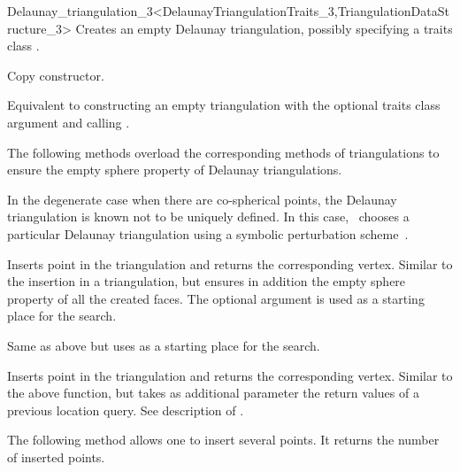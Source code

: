\begin{ccRefClass}{Delaunay_triangulation_3<DelaunayTriangulationTraits_3,TriangulationDataStructure_3>}
{Creates an empty Delaunay triangulation, possibly specifying a traits class
.}

{Copy constructor.}

{Equivalent to constructing an empty triangulation with the optional 
traits class argument and calling .}

\ccOperations


The following methods overload the corresponding methods of
triangulations to ensure the empty sphere property of Delaunay 
triangulations.

In the degenerate case when there are co-spherical points, the Delaunay
triangulation is known not to be uniquely defined. In this case, \cgal\ 
chooses a particular Delaunay triangulation using a symbolic perturbation
scheme~\cite{cgal:dt-pvr3d-03}.


{Inserts point \ccc{p} in the triangulation and returns the corresponding
 vertex. Similar to the insertion in a triangulation, but ensures in
addition the empty sphere property of all the created faces.
The optional argument  is used as a starting place for the search.}

{ Same as above but uses \ccc{hint} as a starting place for the search. }

{Inserts point \ccc{p} in the triangulation and returns the corresponding
 vertex. Similar to the above \ccc{insert()} function, but takes as additional
 parameter the return values of a previous location query.  See description of
 \ccc{Triangulation_3::locate()}.}

The following method allows one to insert several points. It returns the
number of inserted points. 


\end{ccRefClass}
